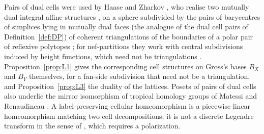 Pairs of dual cells were used by Haase and Zharkov \cite{HZ1,HZ2,HZ3}, who realise two mutually dual integral affine
structures \cite[\S2.4]{HZ1}, \cite[\S2.2]{HZ2} on a sphere subdivided by the pairs of barycentres of simplices lying in mutually dual faces (the
analogue of the dual cell pairs of Definition~\ref{def:DP}) of coherent triangulations of the boundaries of a polar pair of
reflexive polytopes \cite[\S2.1]{HZ1}; for nef-partitions they work with central subdivisions induced by height functions,
which need not be triangulations \cite[\S1, \S2.2]{HZ3}. Proposition~\ref{prop:L1} gives the corresponding cell structures on
Gross's bases $B_X$ and $B_Y$ themselves, for a fan-side subdivision that need not be a triangulation, and
Proposition~\ref{prop:L3} the duality of the lattices. Posets of pairs of dual cells also underlie the
mirror isomorphism of tropical homology groups of Matessi and Renaudineau \cite[Thm.~1.1, \S2]{MR25}. A label-preserving cellular homeomorphism is a
piecewise linear homeomorphism matching two cell decompositions; it is not a discrete Legendre transform in the sense of
\cite[\S1.4]{GSI}, which requires a polarization.

